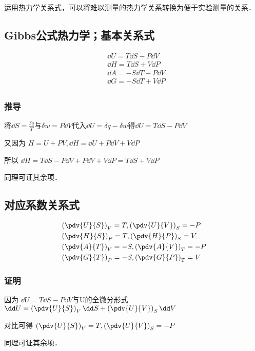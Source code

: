 
运用热力学关系式，可以将难以测量的热力学关系转换为便于实验测量的关系．

\subsection{Gibbs公式热力学；基本关系式}
\begin{align}
&\dd U = T \dd S - P \dd V\\
&\dd H = T \dd S + V \dd P\\
&\dd A = -S \dd T - P \dd V\\
&\dd G = -S \dd T +V \dd P\\
\end{align}

\subsubsection{推导}
将$\dd S = \frac{\delta q}{T}$与$\delta w = P\dd V$代入$\dd U=\delta q-\delta w$得$\dd U = T \dd S - P \dd V$

又因为 $H=U+PV, \dd H = \dd U + P \dd V + V \dd P$

所以 $\dd H = T \dd S - P \dd V+ P \dd V + V \dd P = T \dd S + V \dd P$

同理可证其余项．
\subsection{对应系数关系式}
\begin{align}
&\left(\pdv{U}{S}\right)_V=T, \left(\pdv{U}{V}\right)_S=-P
\\
&\left(\pdv{H}{S}\right)_P=T, \left(\pdv{H}{P}\right)_S=V
\\
&\left(\pdv{A}{T}\right)_V=-S, \left(\pdv{A}{V}\right)_T=-P
\\
&\left(\pdv{G}{T}\right)_P=-S, \left(\pdv{G}{P}\right)_T=V
\end{align}

\subsubsection{证明}
因为 $\dd U = T \dd S - P \dd V$与U的全微分形式 $\dd U = \left(\pdv{U}{S}\right)_V \dd S+\left(\pdv{U}{V}\right)_S \dd V$

对比可得 $\left(\pdv{U}{S}\right)_V=T, \left(\pdv{U}{V}\right)_S=-P$

同理可证其余项．

